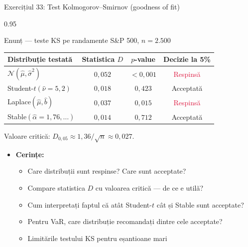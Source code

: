 \documentclass[9pt, aspectratio=169, t]{beamer}
\begin{document}
\begin{frame}[shrink=25]{Exercițiul 33: Test Kolmogorov--Smirnov (goodness of fit)}
\begin{cminipage}{0.95\textwidth}
\begin{block}{Enunț --- teste KS pe randamente S\&P 500, $n = 2.500$}
\small
\renewcommand{\arraystretch}{1.2}
\begin{center}
\begin{tabular}{lccc}
\toprule
\textbf{Distribuție testată} & \textbf{Statistica $D$} & \textbf{$p$-value} & \textbf{Decizie la 5\%} \\
\midrule
$\mathcal{N}(\hat\mu, \hat\sigma^2)$ & $0{,}052$ & $< 0{,}001$ & \textcolor{Crimson}{Respinsă} \\
Student-$t(\hat\nu = 5{,}2)$ & $0{,}018$ & $0{,}423$ & \textcolor{Forest}{Acceptată} \\
Laplace$(\hat\mu, \hat b)$ & $0{,}037$ & $0{,}015$ & \textcolor{Crimson}{Respinsă} \\
Stable$(\hat\alpha = 1{,}76, \ldots)$ & $0{,}014$ & $0{,}712$ & \textcolor{Forest}{Acceptată} \\
\bottomrule
\end{tabular}
\end{center}
Valoare critică: $D_{0{,}05} \approx 1{,}36/\sqrt{n} \approx 0{,}027$.
\end{block}
\begin{itemize}\setlength{\itemsep}{0pt}
    \item \textbf{Cerințe:}
    \begin{itemize}\setlength{\itemsep}{0pt}
        \item Care distribuții sunt respinse? Care sunt acceptate?
        \item Compare statistica $D$ cu valoarea critică --- de ce e utilă?
        \item Cum interpretați faptul că atât Student-$t$ cât și Stable sunt acceptate?
        \item Pentru VaR, care distribuție recomandați dintre cele acceptate?
        \item Limitările testului KS pentru eșantioane mari
    \end{itemize}
\end{itemize}
\end{cminipage}
\end{frame}
\end{document}
